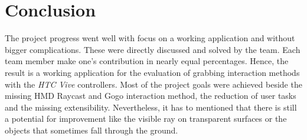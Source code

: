 \section{Conclusion} \label{sec:Conclusion}


The project progress went well with focus on a working application and without bigger complications. These were directly discussed and solved by the team. Each team member make one's contribution in nearly equal percentages. Hence, the result is a working application for the evaluation of grabbing interaction methods with the \textit{HTC Vive} controllers. Most of the project goals were achieved beside the missing HMD Raycast and Gogo interaction method, the reduction of user tasks and the missing extensibility. Nevertheless, it has to mentioned that there is still a potential for improvement like the visible ray on transparent surfaces or the objects that sometimes fall through the ground. 

\newpage

























